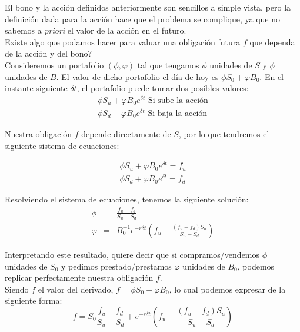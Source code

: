 \documentclass[11pt]{beamer}
\begin{document}
\begin{frame}{{}}
	El bono y la acción definidos anteriormente son sencillos a simple vista, pero la definición dada para la acción hace que el problema se complique, ya que no sabemos a \textit{priori} el valor de la acción en el futuro.\\
	Existe algo que podamos hacer para valuar una obligación futura $f$ que dependa de la acción y del bono?\\
	
	Consideremos un portafolio $(\phi,\varphi)$ tal que tengamos $\phi$ unidades de $S$ y $\phi$ unidades de $B$. El valor de dicho portafolio el día de hoy es $\phi S_0+\varphi B_0$. En el instante siguiente $\delta t$, el portafolio puede tomar dos posibles valores:
	\begin{eqnarray}
	\phi S_u+\varphi B_0 e^{\delta t} \text{\ \ \ Si sube la acción}\\
	\phi S_d+\varphi B_0e^{\delta t} \text{ \ \ \ Si baja la acción}
	\end{eqnarray}
	
	Nuestra obligación $f$ depende directamente de $S$, por lo que tendremos el siguiente sistema de ecuaciones:
	
		\begin{eqnarray}
	\phi S_u+\varphi B_0 e^{\delta t}=f_u\\
	\phi S_d+\varphi B_0e^{\delta t}=f_d
	\end{eqnarray}
\end{frame}


\begin{frame}{{}}
	Resolviendo el sistema de ecuaciones, tenemos la siguiente solución:
	\begin{eqnarray}
	\phi &=& \frac{f_u-f_d}{S_u-S_d}\\
	\varphi &=& B_0^{-1}e^{-r \delta t}\left(f_u-\frac{(f_u-f_d)S_u}{S_u-S_d}\right)
	\end{eqnarray}
	
	Interpretando este resultado, quiere decir que si compramos/vendemos $\phi$ unidades de $S_0$ y pedimos prestado/prestamos $\varphi$ unidades de $B_0$, podemos replicar perfectamente nuestra obligación $f$.\\
	
	Siendo $f$ el valor del derivado, $f=\phi S_0+ \varphi B_0$, lo cual podemos expresar de la siguiente forma:
	\begin{equation}\label{eq:derivbinom1step}
	f=S_0 \frac{f_u-f_d}{S_u-S_d} + e^{-r \delta t}\left(f_u-\frac{(f_u-f_d)S_u}{S_u-S_d}\right)
	\end{equation}
\end{frame}
\end{document}
